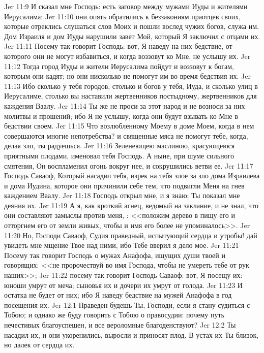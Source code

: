 \rsbpar\vs Jer 11:9 И сказал мне Господь: есть заговор между мужами Иуды и жителями Иерусалима:
\vs Jer 11:10 они опять обратились к беззакониям праотцев своих, которые отреклись слушаться слов Моих и пошли вослед чужих богов, служа им. Дом Израиля и дом Иуды нарушили завет Мой, который Я заключил с отцами их.
\vs Jer 11:11 Посему так говорит Господь: вот, Я наведу на них бедствие, от которого они не могут избавиться, и когда воззовут ко Мне, не услышу их.
\vs Jer 11:12 Тогда город Иуды и жители Иерусалима пойдут и воззовут к богам, которым они кадят; но они нисколько не помогут им во время бедствия их.
\vs Jer 11:13 Ибо сколько у тебя городов, столько и богов у тебя, Иуда, и сколько улиц в Иерусалиме, столько вы наставили жертвенников постыдному, жертвенников для каждения Ваалу.
\vs Jer 11:14 Ты же не проси за этот народ и не возноси за них молитвы и прошений; ибо Я не услышу, когда они будут взывать ко Мне в бедствии своем.
\vs Jer 11:15 Что возлюбленному Моему в доме Моем, когда в нем совершаются многие непотребства? и священные мяса не помогут тебе, когда, делая зло, ты радуешься.
\vs Jer 11:16 Зеленеющею маслиною, красующеюся приятными плодами, именовал тебя Господь. А ныне, при шуме сильного смятения, Он воспламенил огонь вокруг нее, и сокрушились ветви ее.
\vs Jer 11:17 Господь Саваоф, Который насадил тебя, изрек на тебя злое за зло дома Израилева и дома Иудина, которое они причинили себе тем, что подвигли Меня на гнев каждением Ваалу.
\vs Jer 11:18 Господь открыл мне, и я знаю; Ты показал мне деяния их.
\vs Jer 11:19 А я, как кроткий агнец, ведомый на заклание, и не знал, что они составляют замыслы против меня, : <<положим  дерево в пищу его и отторгнем его от земли живых, чтобы и имя его более не упоминалось>>.
\vs Jer 11:20 Но, Господи Саваоф, Судия праведный, испытующий сердца и утробы! дай увидеть мне мщение Твое над ними, ибо Тебе вверил я дело мое.
\vs Jer 11:21 Посему так говорит Господь о мужах Анафофа, ищущих души твоей и говорящих: <<не пророчествуй во имя Господа, чтобы не умереть тебе от рук наших>>;
\vs Jer 11:22 посему так говорит Господь Саваоф: вот, Я посещу их: юноши  умрут от меча; сыновья их и дочери их умрут от голода.
\vs Jer 11:23 И остатка не будет от них; ибо Я наведу бедствие на мужей Анафофа в год посещения их.
\vs Jer 12:1 Праведен будешь Ты, Господи, если я стану судиться с Тобою; и однако же буду говорить с Тобою о правосудии: почему путь нечестивых благоуспешен, и все вероломные благоденствуют?
\vs Jer 12:2 Ты насадил их, и они укоренились, выросли и приносят плод. В устах их Ты близок, но далек от сердца их.
